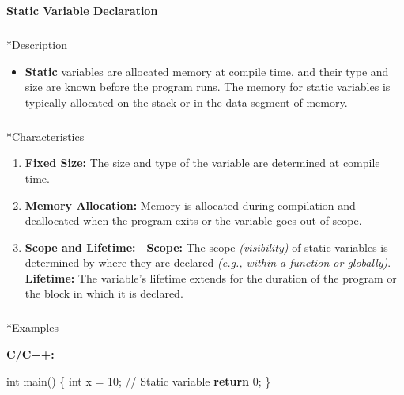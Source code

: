 \documentclass[
  letterpaper,
  DIV=11,
  numbers=noendperiod]{scrreprt}
\makeatletter
\let\oldsubparagraph\subparagraph
\renewcommand{\subparagraph}{
    \@ifstar
      \xxxSubParagraphStar
      \xxxSubParagraphNoStar
  }
\newcommand{\xxxSubParagraphStar}[1]{\oldsubparagraph*{#1}\mbox{}}
\newcommand{\xxxSubParagraphNoStar}[1]{\oldsubparagraph{#1}\mbox{}}
\newenvironment{Shaded}{\begin{snugshade}}{\end{snugshade}}
\newcommand{\CommentTok}[1]{\textcolor[rgb]{0.37,0.37,0.37}{#1}}
\newcommand{\ControlFlowTok}[1]{\textcolor[rgb]{0.00,0.23,0.31}{\textbf{#1}}}
\newcommand{\DataTypeTok}[1]{\textcolor[rgb]{0.68,0.00,0.00}{#1}}
\newcommand{\DecValTok}[1]{\textcolor[rgb]{0.68,0.00,0.00}{#1}}
\newcommand{\NormalTok}[1]{\textcolor[rgb]{0.00,0.23,0.31}{#1}}
\newcommand{\OperatorTok}[1]{\textcolor[rgb]{0.37,0.37,0.37}{#1}}
\providecommand{\tightlist}{%
  \setlength{\itemsep}{0pt}\setlength{\parskip}{0pt}}
\makeatother
\begin{document}
\begin{tcolorbox}[enhanced jigsaw, colframe=quarto-callout-note-color-frame, toprule=.15mm, bottomrule=.15mm, rightrule=.15mm, colback=white, breakable, arc=.35mm, opacityback=0, left=2mm, leftrule=.75mm]

\vspace{-3mm}\textbf{Static Variable Declaration}\vspace{3mm}

\subparagraph*{Description}\label{description-10}

\begin{itemize}
\tightlist
\item
  \textbf{Static} variables are allocated memory at compile time, and
  their type and size are known before the program runs. The memory for
  static variables is typically allocated on the stack or in the data
  segment of memory.
\end{itemize}

\subparagraph*{Characteristics}\label{characteristics}

\begin{enumerate}
\def\labelenumi{\arabic{enumi}.}
\tightlist
\item
  \textbf{Fixed Size:} The size and type of the variable are determined
  at compile time.
\item
  \textbf{Memory Allocation:} Memory is allocated during compilation and
  deallocated when the program exits or the variable goes out of scope.
\item
  \textbf{Scope and Lifetime:} - \textbf{Scope:} The scope
  \emph{(visibility)} of static variables is determined by where they
  are declared \emph{(e.g., within a function or globally)}. -
  \textbf{Lifetime:} The variable's lifetime extends for the duration of
  the program or the block in which it is declared.
\end{enumerate}

\subparagraph*{Examples}\label{examples-6}

\textbf{C/C++:}

\begin{Shaded}
\begin{Highlighting}[]
\DataTypeTok{int}\NormalTok{ main}\OperatorTok{()} \OperatorTok{\{}
    \DataTypeTok{int}\NormalTok{ x }\OperatorTok{=} \DecValTok{10}\OperatorTok{;} \CommentTok{// Static variable}
    \ControlFlowTok{return} \DecValTok{0}\OperatorTok{;}
\OperatorTok{\}}
\end{Highlighting}
\end{Shaded}


\end{tcolorbox}
\end{document}
